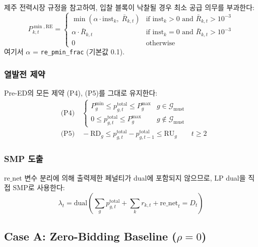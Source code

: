\documentclass[11pt, a4paper]{article}
\begin{document}
제주 전력시장 규정을 참고하여, 입찰 블록이 낙찰될 경우 최소 공급 의무를 부과한다:
\begin{equation}\label{eq:re_pmin}
    \boxed{P_{k,t}^{\min,\text{RE}} = \begin{cases}
        \min(\alpha \cdot \text{inst}_k, \; \bar{R}_{k,t}) & \text{if } \text{inst}_k > 0 \text{ and } \bar{R}_{k,t} > 10^{-3} \\
        \alpha \cdot \bar{R}_{k,t} & \text{if } \text{inst}_k = 0 \text{ and } \bar{R}_{k,t} > 10^{-3} \\
        0 & \text{otherwise}
    \end{cases}}
\end{equation}
여기서 $\alpha$ = \texttt{re\_pmin\_frac} (기본값 0.1).

\subsubsection{열발전 제약}

Pre-ED의 모든 제약 (P4), (P5)를 그대로 유지한다:
\begin{align}
    &\text{(P4)} \quad
    \begin{cases}
        P_g^{\min} \leq p_{g,t}^{\text{total}} \leq P_g^{\max} & g \in \mathcal{G}_{\text{must}} \\
        0 \leq p_{g,t}^{\text{total}} \leq P_g^{\max}           & g \notin \mathcal{G}_{\text{must}}
    \end{cases} \\
    &\text{(P5)} \quad
    -\text{RD}_g \leq p_{g,t}^{\text{total}} - p_{g,t-1}^{\text{total}} \leq \text{RU}_g \qquad t \geq 2
\end{align}

\subsubsection{SMP 도출}

$\text{re\_net}$ 변수 분리에 의해 출력제한 페널티가 dual에 포함되지 않으므로,
LP dual을 직접 SMP로 사용한다:
\begin{equation}\label{eq:post_smp}
    \boxed{\lambda_t = \text{dual}\!\left(\sum_g p_{g,t}^{\text{total}} + \sum_k r_{k,t} + \text{re\_net}_t = D_t\right)}
\end{equation}

\subsection{Case A: Zero-Bidding Baseline ($\rho = 0$)}
\end{document}
